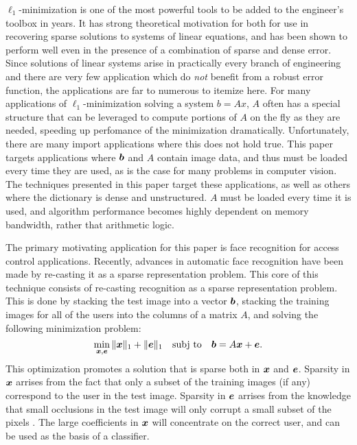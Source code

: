 \documentclass[10pt,twocolumn,letterpaper]{article}
\begin{document}
$\ell_1$-minimization is one of the most powerful tools to be added to the engineer's
toolbox in years.  It has strong theoretical motivation for both for use in recovering sparse
solutions to systems of linear equations, and has been shown to perform well even in the
presence of a combination of sparse and dense error.  Since solutions of linear systems
arise in practically every branch of engineering and there are very few application which
do {\em not} benefit from a robust error function, the applications are far to numerous to
itemize here.  
For many applications of $\ell_1$-minimization solving a system $b=Ax$, $A$ often has a
special structure that can be leveraged to compute portions of $A$ on the fly
as they are needed, speeding up perfomance of the minimization dramatically.
Unfortunately, there are many import applications where this does not hold true.
This paper targets applications where $\boldsymbol{b}$ and $A$ contain
image data, and thus must be loaded every time they are used, as is the 
case for many problems in computer vision.
The techniques presented in this paper target these applications, as well
as others where the dictionary is dense and unstructured. $A$ must be loaded every time
it is used, and algorithm performance becomes highly dependent on memory bandwidth, rather
that arithmetic logic.

The primary motivating application for this paper is face recognition for access control applications.
Recently, advances in automatic face recognition have been made by re-casting
it as a sparse representation problem.  This core of this technique consists of
re-casting recognition as a sparse representation problem. This is done by  
stacking the test image into a vector $\boldsymbol{b}$, stacking the training images for
all of the users into the columns of a matrix $A$, and solving the following
minimization problem:
\begin{equation}
\min_{{\boldsymbol{x}}, \boldsymbol{e}} \| {\boldsymbol{x}} \|_1 + \|\boldsymbol{e}\|_1 \quad \textup{subj to} \quad \boldsymbol{b} = A {\boldsymbol{x}} + \boldsymbol{e}.
\end{equation}
This optimization promotes a solution that is sparse both in ${\boldsymbol{x}}$ and $\boldsymbol{e}$. 
Sparsity in ${\boldsymbol{x}}$ arrises from the fact that only a subset of the training images (if any)
correspond to the user in the test image.  Sparsity in $\boldsymbol{e}$ arrises from the knowledge
that small occlusions in the test image will only corrupt a small subset of the pixels \cite{Wright2009-PAMI}.
The large coefficients in ${\boldsymbol{x}}$ will concentrate on the correct user, and can be used as the basis of a classifier.
\end{document}
